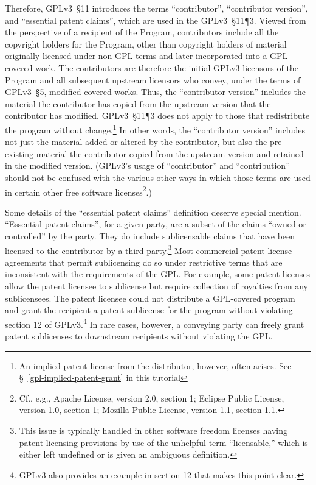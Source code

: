 Therefore, GPLv3~\S11 introduces the terms ``contributor'', ``contributor version'', and
``essential patent claims'', which are
used in the GPLv3~\S11\P3.   Viewed from the perspective of a recipient of the
Program, contributors include all the copyright holders for the Program,
other than copyright holders of material originally licensed under non-GPL
terms and later incorporated into a GPL-covered work.  The contributors are
therefore the initial GPLv3 licensors of the Program and all subsequent
upstream licensors who convey, under the terms of GPLv3~\S5, modified covered
works.
Thus, the ``contributor version'' includes the material the contributor has copied from the
upstream version that the contributor has modified.  GPLv3~\S11\P3
 does not apply to those that redistribute the program
without change.\footnote{An implied patent license from the distributor,
however, often arises.  See \S~\ref{gpl-implied-patent-grant} in this tutorial}
In other words, the ``contributor version'' includes not just
the material added or altered by the contributor, but also the pre-existing
material the contributor copied from the upstream version and retained in the
modified version.  (GPLv3's usage of ``contributor'' and ``contribution'' should
not be confused with the various other ways in which those terms are used in
certain other free software licenses\footnote{Cf., e.g., Apache License,
  version 2.0, section 1; Eclipse Public License, version 1.0, section 1;
  Mozilla Public License, version 1.1, section 1.1.}.)

Some details of the ``essential patent claims'' definition deserve special
mention.  ``Essential patent claims'', for a given party, are a subset of the
claims ``owned or controlled'' by the party.  They do include sublicensable
claims that have been licensed to the contributor by a third
party.\footnote{This issue is typically handled in other software freedom
  licenses having patent licensing provisions by use of the unhelpful term
  ``licensable,'' which is either left undefined or is given an ambiguous
  definition.}  Most commercial patent license agreements that permit
sublicensing do so under restrictive terms that are inconsistent with the
requirements of the GPL\@.  For example, some patent licenses allow the
patent licensee to sublicense but require collection of royalties from any
sublicensees.  The patent licensee could not distribute a GPL-covered program
and grant the recipient a patent sublicense for the program without violating
section 12 of GPLv3.\footnote{GPLv3 also provides an example in section 12
  that makes this point clear.}  In rare cases, however, a conveying party
can freely grant patent sublicenses to downstream recipients without
violating the GPL\@.

